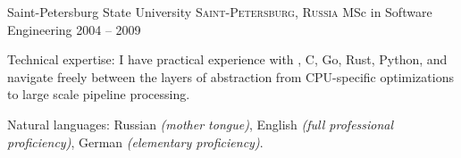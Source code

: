 \documentclass[10pt,a4paper]{article}
\begin{document}
\headedsection
  {Saint-Petersburg State University}
  {\textsc{Saint-Petersburg, Russia}} {%
  \headedsubsection
    {MSc in Software Engineering}
    {2004 -- 2009}
    {}
}

\spacedhrule{0.6em}{-0.4em}


\inlineheadsection  %
  {Technical expertise:}
  {I have practical experience with \CPP, C, Go, Rust, Python, and navigate freely between the layers of abstraction from CPU-specific optimizations to large scale pipeline processing.}

\vspace{0.5em}
\inlineheadsection
  {Natural languages:}
  {Russian \emph{(mother tongue)}, English \emph{(full professional proficiency)}, German \emph{(elementary proficiency)}.}
\end{document}
